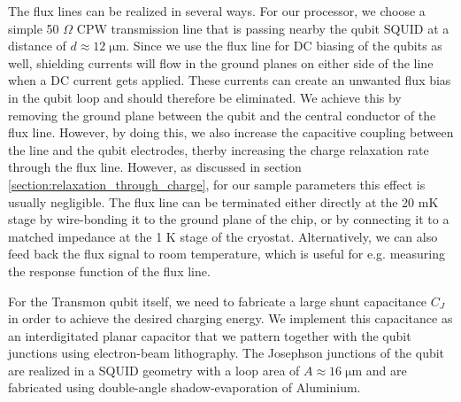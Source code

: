 \smallskip

The flux lines can be realized in several ways. For our processor, we choose a simple 50 $\Omega$ CPW transmission line that is passing nearby the qubit SQUID at a distance of $d\approx 12\;\mathrm{\mu m}$. Since we use the flux line for DC biasing of the qubits as well, shielding currents will flow in the ground planes on either side of the line when a DC current gets applied. These currents can create an unwanted flux bias in the qubit loop and should therefore be eliminated. We achieve this by removing the ground plane between the qubit and the central conductor of the flux line. However, by doing this, we also increase the capacitive coupling between the line and the qubit electrodes, therby increasing the charge relaxation rate through the flux line. However, as discussed in section \ref{section:relaxation_through_charge}, for our sample parameters this effect is usually negligible. The flux line can be terminated either directly at the 20 mK stage by wire-bonding it to the ground plane of the chip, or by connecting it to a matched impedance at the 1 K stage of the cryostat. Alternatively, we can also feed back the flux signal to room temperature, which is useful for e.g. measuring the response function of the flux line.

\smallskip

For the Transmon qubit itself, we need to fabricate a large shunt capacitance $C_J$ in order to achieve the desired charging energy. We implement this capacitance as an interdigitated planar capacitor that we pattern together with the qubit junctions using electron-beam lithography. The Josephson junctions of the qubit are realized in a SQUID geometry with a loop area of $A\approx 16\;\mathrm{\mu m}$ and are fabricated using double-angle shadow-evaporation of Aluminium.

